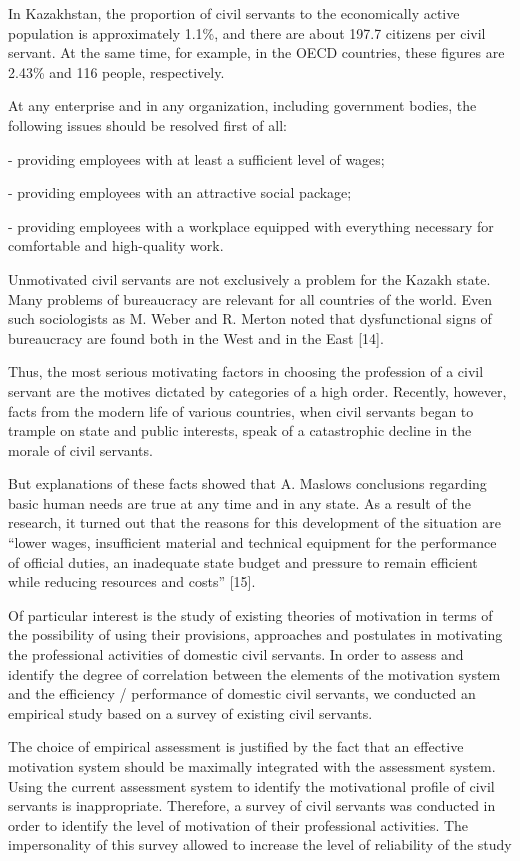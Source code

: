 \begin{multicols}{2}
In Kazakhstan, the proportion of civil servants to the economically
active population is approximately 1.1\%, and there are about 197.7
citizens per civil servant. At the same time, for example, in the OECD
countries, these figures are 2.43\% and 116 people, respectively.

At any enterprise and in any organization, including government bodies,
the following issues should be resolved first of all:

- providing employees with at least a sufficient level of wages;

- providing employees with an attractive social package;

- providing employees with a workplace equipped with everything
necessary for comfortable and high-quality work.

Unmotivated civil servants are not exclusively a problem for the Kazakh
state. Many problems of bureaucracy are relevant for all countries of
the world. Even such sociologists as M. Weber and R. Merton noted that
dysfunctional signs of bureaucracy are found both in the West and in the
East {[}14{]}.

Thus, the most serious motivating factors in choosing the profession of
a civil servant are the motives dictated by categories of a high order.
Recently, however, facts from the modern life of various countries, when
civil servants began to trample on state and public interests, speak of
a catastrophic decline in the morale of civil servants.

But explanations of these facts showed that A. Maslow\textquotesingle s
conclusions regarding basic human needs are true at any time and in any
state. As a result of the research, it turned out that the reasons for
this development of the situation are ``lower wages, insufficient
material and technical equipment for the performance of official duties,
an inadequate state budget and pressure to remain efficient while
reducing resources and costs'' {[}15{]}.

Of particular interest is the study of existing theories of motivation
in terms of the possibility of using their provisions, approaches and
postulates in motivating the professional activities of domestic civil
servants. In order to assess and identify the degree of correlation
between the elements of the motivation system and the efficiency /
performance of domestic civil servants, we conducted an empirical study
based on a survey of existing civil servants.

The choice of empirical assessment is justified by the fact that an
effective motivation system should be maximally integrated with the
assessment system. Using the current assessment system to identify the
motivational profile of civil servants is inappropriate. Therefore, a
survey of civil servants was conducted in order to identify the level of
motivation of their professional activities. The impersonality of this
survey allowed to increase the level of reliability of the study


\end{multicols}
